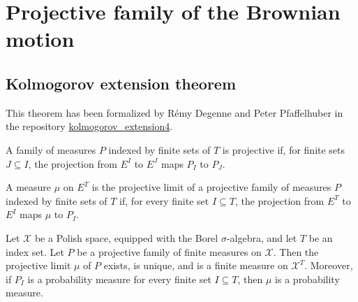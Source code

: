 \chapter{Projective family of the Brownian motion}
\label{chap:projective_family}


\section{Kolmogorov extension theorem}

This theorem has been formalized by Rémy Degenne and Peter Pfaffelhuber in the repository \href{https://github.com/RemyDegenne/kolmogorov_extension4}{kolmogorov\_extension4}.

\begin{definition}\label{def:IsProjectiveMeasureFamily}
  \mathlibok
A family of measures $P$ indexed by finite sets of $T$ is projective if, for finite sets $J \subseteq I$, the projection from $E^I$ to $E^J$ maps $P_I$ to $P_J$.
\end{definition}


\begin{definition}\label{def:IsProjectiveLimit}
  \mathlibok
A measure $\mu$ on $E^T$ is the projective limit of a projective family of measures $P$ indexed by finite sets of $T$ if, for every finite set $I \subseteq T$, the projection from $E^T$ to $E^I$ maps $\mu$ to $P_I$.
\end{definition}


\begin{theorem}\label{thm:kolmogorovExtension}
  \leanok
Let $\mathcal{X}$ be a Polish space, equipped with the Borel $\sigma$-algebra, and let $T$ be an index set.
Let $P$ be a projective family of finite measures on $\mathcal{X}$.
Then the projective limit $\mu$ of $P$ exists, is unique, and is a finite measure on $\mathcal{X}^T$.
Moreover, if $P_I$ is a probability measure for every finite set $I \subseteq T$, then $\mu$ is a probability measure.
\end{theorem}

